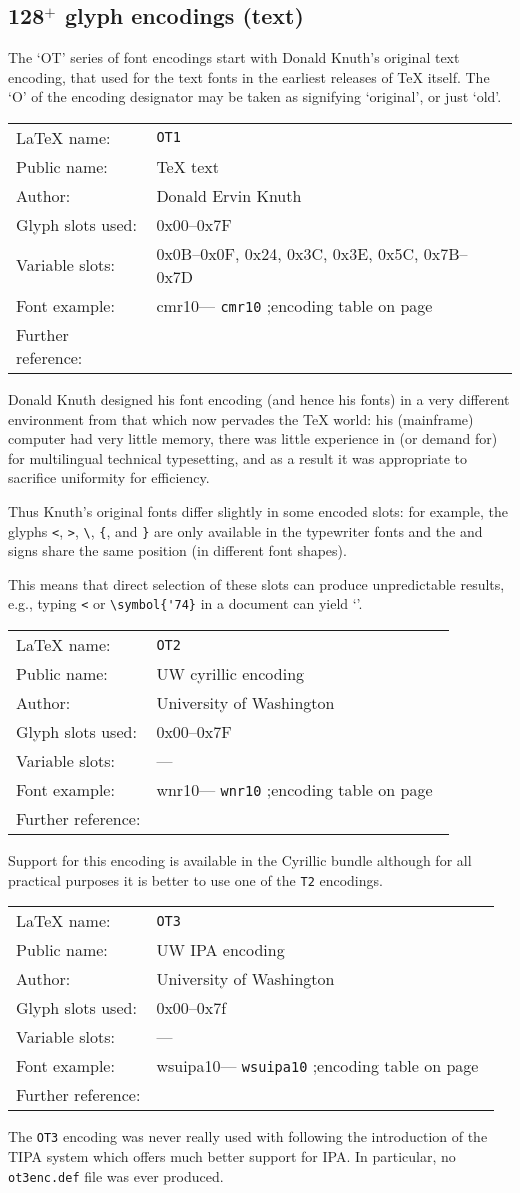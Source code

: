 \documentclass{ltxguide}[1994/11/20]
\makeatletter
\providecommand{\Enc}[1]{\texttt{#1}}
\providecommand{\File}[1]{%
  \texttt{#1}}
\newenvironment{encodinginfo}[7]%
  {\noindent
   \begin{tabularx}{\linewidth}{@{}l>{\raggedright\let\\\tabularnewline}X}%
     \LaTeX{} name:          & \texttt{#1}\\%
     Public name:          & #2\\%
     Author:                   & #3\\%
     Glyph slots used: & #4\\%
     Variable slots:     & #5\\%
     Font example:     & \def\@tempa{#6}\ifx\@tempa\@empty---%
                            \else\texttt{#6}\referenceftable{#6}\fi\\%
     Further reference:                & #7%
   \end{tabularx}%
   \par\nobreak
   \vspace*{3pt}%
   \quote
  }%
  {\endquote
   \vspace{6pt}}
\def\referenceftable#1{
  \@ifundefined{r@fonttable:#1}%
  \relax
  {;\space encoding table on page~\pageref{fonttable:#1}}%
}
\makeatother
\begin{document}
\subsection{128$^+$ glyph encodings (text)}

The `OT' series of font encodings start with Donald Knuth's original
text encoding, that used for the text fonts in the earliest releases
of \TeX{} itself.  The `O' of the encoding designator may be taken as
signifying `original', or just `old'.

\begin{encodinginfo}{OT1}
        {\TeX{} text}
        {Donald Ervin Knuth}
        {0x00--0x7F}
        {0x0B--0x0F, 0x24, 0x3C, 0x3E, 0x5C, 0x7B--0x7D}
        {cmr10}
        {\cite[p.427]{A-W:DKn86}}

  Donald Knuth designed his font encoding (and hence his fonts) in a
  very different environment from that which now pervades the \TeX{}
  world: his (mainframe) computer had very little memory, there was
  little experience in (or demand for) for multilingual technical
  typesetting, and as a result it was appropriate to sacrifice
  uniformity for efficiency.

  Thus Knuth's original fonts differ slightly in some encoded slots:
  for example, the glyphs \texttt{\string<}, \texttt{\string>},
  \verb=\=, \verb={=, and \verb=}= are only available in the
  typewriter fonts and the \textdollar{} and \textsterling{} signs
  share the same position (in different font shapes).

  This means that direct selection of these slots can produce
  unpredictable results, e.g., typing \texttt{\string<} or
  \verb=\symbol{'74}= in a document can yield `\textquestiondown'.
\end{encodinginfo}


\begin{encodinginfo}{OT2}
        {UW cyrillic encoding}
        {University of Washington}
        {0x00--0x7F}
        {---}
        {wnr10}
        {\cite{Beeton:TB6-3-124}}
  Support for this encoding is available in the Cyrillic bundle although for
  all practical purposes it is better to use one of the \Enc{T2} encodings.
\end{encodinginfo}


\begin{encodinginfo}{OT3}
        {UW IPA encoding}
        {University of Washington}
        {0x00--0x7f}
        {---}
        {wsuipa10}
        {\cite[p.149]{CorkGW:91}}
  The \Enc{OT3} encoding was never really used with \LaTeXe{}
  following the introduction of the TIPA system which offers much
  better support for IPA. In particular, no \File{ot3enc.def}
  file was ever produced.
\end{encodinginfo}
\end{document}
